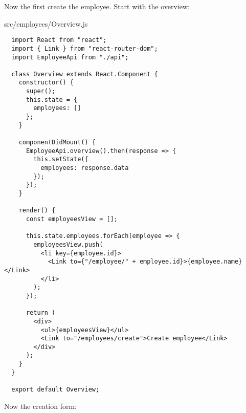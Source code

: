 Now the first create the employee. Start with the overview:

src/employees/Overview.js
\begin{verbatim}
  import React from "react";
  import { Link } from "react-router-dom";
  import EmployeeApi from "./api";

  class Overview extends React.Component {
    constructor() {
      super();
      this.state = {
        employees: []
      };
    }

    componentDidMount() {
      EmployeeApi.overview().then(response => {
        this.setState({
          employees: response.data
        });
      });
    }

    render() {
      const employeesView = [];

      this.state.employees.forEach(employee => {
        employeesView.push(
          <li key={employee.id}>
            <Link to={"/employee/" + employee.id}>{employee.name}</Link>
          </li>
        );
      });

      return (
        <div>
          <ul>{employeesView}</ul>
          <Link to="/employees/create">Create employee</Link>
        </div>
      );
    }
  }

  export default Overview;
\end{verbatim}

Now the creation form:

